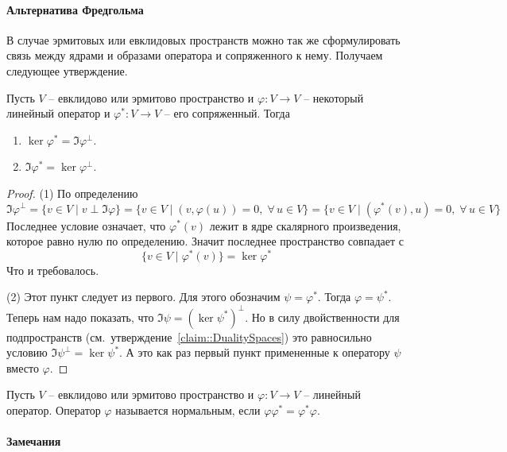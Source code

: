\paragraph{Альтернатива Фредгольма}

В случае эрмитовых или евклидовых пространств можно так же сформулировать связь между ядрами и образами оператора и сопряженного к нему.
Получаем следующее утверждение.

\begin{claim}
\label{claim::EuclidHermitFredholm}
Пусть $V$ -- евклидово или эрмитово пространство и $\varphi \colon V\to V$ -- некоторый линейный оператор и $\varphi^*\colon V\to V$ -- его сопряженный.
Тогда
\begin{enumerate}
\item $\ker\varphi^* = \Im\varphi^\perp$.

\item $\Im \varphi^* = \ker \varphi^\perp$.
\end{enumerate}
\end{claim}
\begin{proof}
(1) По определению
\[
\Im \varphi ^\perp = \{v\in V \mid v \perp \Im\varphi\} = \{v\in V\mid (v, \varphi(u)) = 0,\;\forall\,u\in V\} = \{v\in V\mid (\varphi^*(v), u) = 0,\;\forall\, u\in V\}
\]
Последнее условие означает, что $\varphi^*(v)$ лежит в ядре скалярного произведения, которое равно нулю по определению.
Значит последнее пространство совпадает с
\[
\{v\in V\mid \varphi^*(v)\} = \ker \varphi^*
\]
Что и требовалось.

(2) Этот пункт следует из первого.
Для этого обозначим $\psi = \varphi^*$.
Тогда $\varphi = \psi^*$.
Теперь нам надо показать, что $\Im \psi = (\ker \psi^*)^\perp$.
Но в силу двойственности для подпространств (см.~утверждение~\ref{claim::DualitySpaces}) это равносильно условию $\Im \psi^\perp = \ker \psi^*$.
А это как раз первый пункт примененные к оператору $\psi$ вместо $\varphi$.	
\end{proof}

\begin{definition}
Пусть $V$ -- евклидово или эрмитово пространство и $\varphi \colon V\to V$ -- линейный оператор.
Оператор $\varphi$ называется нормальным, если $\varphi \varphi^* = \varphi^* \varphi$.
\end{definition}

\paragraph{Замечания}

